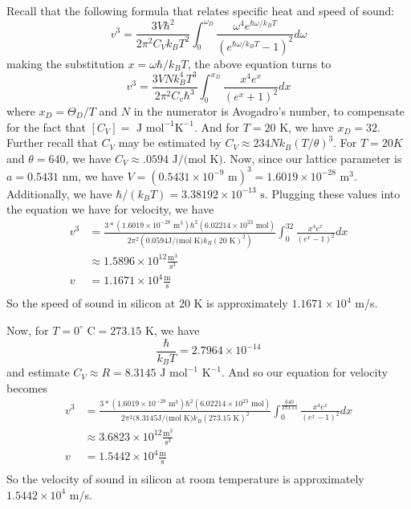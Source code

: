 \documentclass{article}
\begin{document}
Recall that the following formula that relates specific heat and speed of sound:
\[v^3 = \frac{3V\hbar^2}{2\pi^2C_Vk_BT^2}\int_0^{\omega_D}\frac{\omega^4e^{\hbar\omega/k_BT}}{(e^{\hbar\omega/k_BT} - 1)^2}d\omega\]
making the substitution $x = \omega\hbar/k_BT$, the above equation turns to
\[v^3 = \frac{3VNk_B^4T^3}{2\pi^2C_v\hbar^3}\int_0^{x_D}\frac{x^4e^x}{(e^x + 1)^2}dx\]
where $x_D = \Theta_D/T$ and $N$ in the numerator is Avogadro's number, to compensate for the fact that $[C_V] = \text{ J mol}^{-1}\text{K}^{-1}$. And for $T = 20 \text{ K}$, we have $x_D = 32$.
\newline
Further recall that $C_V$ may be estimated by $C_V \approx 234Nk_B(T/\theta)^3$. For $T = 20K$ and $\theta = 640$, we have $C_V \approx .0594 \text{ J/(mol K)}$.
\newline
Now, since our lattice parameter is $a = 0.5431 \text{ nm}$, we have $V = (0.5431 \times 10^{-9} \text{ m})^3 = 1.6019 \times 10^{-28} \text{ m}^3$. Additionally, we have $\hbar/(k_BT) = 3.38192\times 10^{-13} \text{ s}$. 
Plugging these values into the equation we have for velocity, we have
\begin{align*}
    v^3 &= \frac{3*(1.6019\times 10^{-28} \text{ m}^3)\hbar^2(6.02214\times 10^{23} \text{ mol})}{2\pi^2(0.0594 \text{J}/\text{(mol K)}k_B(20 \text{ K})^2)}\int_0^{32}\frac{x^4e^{x}}{(e^{x} - 1)^2}dx \\
    &\approx 1.5896\times 10^{12} \frac{\text{m}^3}{\text{s}^3} \\
    v &= 1.1671\times 10^4 \frac{\text{m}}{\text{s}} \\
\end{align*}
So the speed of sound in silicon at 20 K is approximately $1.1671 \times 10^4 $ m/s.
\newline

Now, for $T = 0^{\circ} \text{ C} = 273.15 \text{ K}$, we have 
\[\frac{\hbar}{k_BT} = 2.7964\times 10^{-14}\]
and estimate $C_V \approx R = 8.3145 \text{ J mol}^{-1}\text{ K}^{-1}$.
\newline
And so our equation for velocity becomes
\begin{align*}
    v^3 &= \frac{3*(1.6019\times 10^{-28} \text{ m}^3)\hbar^2(6.02214\times 10^{23} \text{ mol})}{2\pi^2(8.3145 \text{J}/\text{(mol K)}k_B(273.15 \text{ K})^2}\int_0^{\frac{640}{273.15}}\frac{x^4e^{x}}{(e^{x} - 1)^2}dx\\
    &\approx 3.6823\times 10^{12} \frac{\text{m}^3}{\text{s}^3} \\
    v &= 1.5442\times 10^4 \frac{\text{m}}{\text{s}} \\
\end{align*}
So the velocity of sound in silicon at room temperature is approximately $1.5442\times 10^4$ m/s.
\end{document}
